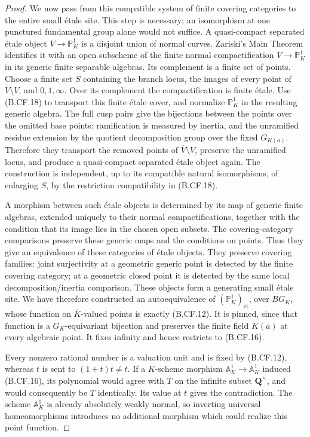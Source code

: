 \documentclass[11pt,a4paper]{article}
\newcommand{\Q}{\mathbf Q}
\begin{document}
\begin{proof}
We now pass from this compatible system of finite covering
categories to the entire small étale site. This step is necessary;
an isomorphism at one punctured fundamental group alone would
not suffice. A quasi-compact separated étale object
\(V\to\mathbb P^1_K\) is a disjoint union of normal curves.
Zariski's Main Theorem identifies it with an open subscheme of
the finite normal compactification \(\overline V\to\mathbb P^1_K\)
in its generic finite separable algebras. Its complement is a
finite set of points. Choose a finite set \(S\) containing the
branch locus, the images of every point of
\(\overline V\setminus V\), and \(0,1,\infty\).
Over its complement the compactification is finite étale.
Use (B.CF.18) to transport this
finite étale cover, and normalize \(\mathbb P^1_K\) in the
resulting generic algebra. The full cusp pairs give the
bijections between the points over the omitted base points:
ramification is measured by inertia, and the unramified residue
extension by the quotient decomposition group over the fixed
\(G_{K(a)}\). Therefore they transport the removed points of
\(\overline V\setminus V\), preserve the unramified locus, and
produce a quasi-compact separated étale object again.
The construction is independent, up to its compatible natural
isomorphisms, of enlarging \(S\), by the restriction
compatibility in (B.CF.18).

A morphism between such étale objects is determined by its map
of generic finite algebras, extended uniquely to their normal
compactifications, together with the condition that its image
lies in the chosen open subsets. The covering-category
comparisons preserve these generic maps and the conditions on
points. Thus they give an equivalence of these categories of
étale objects. They preserve covering families: joint
surjectivity at a geometric generic point is detected by the
finite covering category; at a geometric closed point it is
detected by the same local decomposition/inertia comparison.
These objects form a generating small étale site. We have
therefore constructed an autoequivalence of
\((\mathbb P^1_K)_{\mathrm{et}}\), over \(BG_K\), whose
function on \(\overline K\)-valued points is exactly (B.CF.12). It is pinned,
since that function is a \(G_K\)-equivariant bijection and
preserves the finite field \(K(a)\) at every algebraic point.
It fixes infinity and hence restricts to (B.CF.16).

Every nonzero rational number is a valuation unit and is fixed
by (B.CF.12), whereas \(t\) is sent to \((1+t)t\ne t\).
If a \(K\)-scheme morphism \(\mathbb A^1_K\to\mathbb A^1_K\)
induced (B.CF.16), its polynomial would agree with \(T\) on the
infinite subset \(\Q^\times\), and would consequently be \(T\)
identically. Its value at \(t\) gives the contradiction.
The scheme \(\mathbb A^1_K\) is already absolutely weakly
normal, so inverting universal homeomorphisms introduces no
additional morphism which could realize this point function.
\end{proof}
\end{document}

